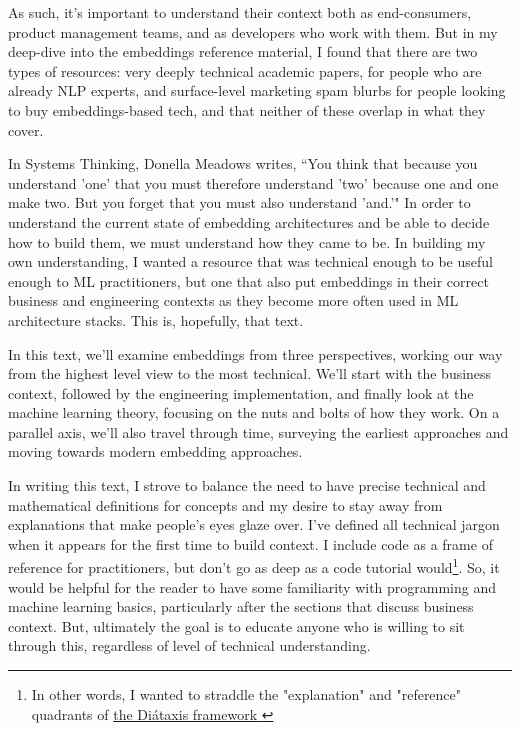 \documentclass[11pt, table]{diazessay} %
\begin{document}
\begin{sloppypar}
As such, it's important to understand their context both as end-consumers, product management teams, and as developers who work with them. But in my deep-dive into the embeddings reference material, I found that there are two types of resources: very deeply technical academic papers, for people who are already NLP experts, and surface-level marketing spam blurbs for people looking to buy embeddings-based tech, and that neither of these overlap in what they cover.  

In Systems Thinking, Donella Meadows writes, “You think that because you understand 'one' that you must therefore understand 'two' because one and one make two. But you forget that you must also understand 'and.'" \citep{meadows2008thinking} In order to understand the current state of embedding architectures and be able to decide how to build them, we must understand how they came to be. In building my own understanding, I wanted a resource that was technical enough to be useful enough to ML practitioners, but one that also put embeddings in their correct business and engineering contexts as they become more often used in ML architecture stacks. This is, hopefully, that text.

In this text, we'll examine embeddings from three perspectives, working our way from the highest level view to the most technical. We'll start with the business context, followed by the engineering implementation, and finally look at the machine learning theory, focusing on the nuts and bolts of how they work. On a parallel axis, we'll also travel through time, surveying the earliest approaches and moving towards modern embedding approaches.  

In writing this text, I strove to balance the need to have precise technical and mathematical definitions for concepts and my desire to stay away from explanations that make people's eyes glaze over.  I've defined all technical jargon when it appears for the first time to build context. I include code as a frame of reference for practitioners, but don't go as deep as a code tutorial would\footnote{In other words, I wanted to straddle the "explanation" and "reference" quadrants of \href{https://diataxis.fr/}{the Diátaxis framework }}. So, it would be helpful for the reader to have some familiarity with programming and machine learning basics, particularly after the sections that discuss business context. But, ultimately the goal is to educate anyone who is willing to sit through this, regardless of level of technical understanding.


\end{sloppypar}
\end{document}
